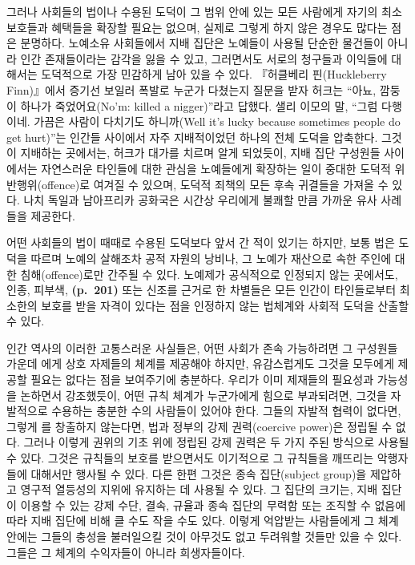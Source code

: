 그러나 사회들의 법이나 수용된 도덕이 그 범위 안에 있는 모든 사람에게
자기의 최소 보호들과 혜택들을 확장할 필요는 없으며, 실제로 그렇게 하지
않은 경우도 많다는 점은 분명하다. 노예소유 사회들에서 지배 집단은
노예들이 사용될 단순한 물건들이 아니라 인간 존재들이라는 감각을 잃을 수
있고, 그러면서도 서로의 청구들과 이익들에 대해서는 도덕적으로 가장
민감하게 남아 있을 수 있다. 『허클베리 핀(Huckleberry Finn)』에서 증기선
보일러 폭발로 누군가 다쳤는지 질문을 받자 허크는 “아뇨, 깜둥이 하나가
죽었어요(No'm: killed a nigger)”라고 답했다. 샐리 이모의 말, “그럼
다행이네. 가끔은 사람이 다치기도 하니까(Well it's lucky because
sometimes people do get hurt)”는 인간들 사이에서 자주 지배적이었던
하나의 전체 도덕을 압축한다. 그것이 지배하는 곳에서는, 허크가 대가를
치르며 알게 되었듯이, 지배 집단 구성원들 사이에서는 자연스러운 타인들에
대한 관심을 노예들에게 확장하는 일이 중대한 도덕적 위반행위(offence)로
여겨질 수 있으며, 도덕적 죄책의 모든 후속 귀결들을 가져올 수 있다. 나치
독일과 남아프리카 공화국은 시간상 우리에게 불쾌할 만큼 가까운 유사
사례들을 제공한다.

어떤 사회들의 법이 때때로 수용된 도덕보다 앞서 간 적이 있기는 하지만,
보통 법은 도덕을 따르며 노예의 살해조차 공적 자원의 낭비나, 그 노예가
재산으로 속한 주인에 대한 침해(offence)로만 간주될 수 있다. 노예제가
공식적으로 인정되지 않는 곳에서도, 인종, 피부색, \textbf{(p.~201)} 또는
신조를 근거로 한 차별들은 모든 인간이 타인들로부터 최소한의 보호를 받을
자격이 있다는 점을 인정하지 않는 법체계와 사회적 도덕을 산출할 수 있다.

인간 역사의 이러한 고통스러운 사실들은, 어떤 사회가 존속 가능하려면 그
구성원들 가운데 에게 상호 자제들의 체계를 제공해야 하지만,
유감스럽게도 그것을 모두에게 제공할 필요는 없다는 점을 보여주기에
충분하다. 우리가 이미 제재들의 필요성과 가능성을 논하면서 강조했듯이,
어떤 규칙 체계가 누군가에게 힘으로 부과되려면, 그것을 자발적으로
수용하는 충분한 수의 사람들이 있어야 한다. 그들의 자발적 협력이 없다면,
그렇게 를 창출하지 않는다면, 법과 정부의 강제
권력(coercive power)은 정립될 수 없다. 그러나 이렇게 권위의 기초 위에
정립된 강제 권력은 두 가지 주된 방식으로 사용될 수 있다. 그것은 규칙들의
보호를 받으면서도 이기적으로 그 규칙들을 깨뜨리는 악행자들에 대해서만
행사될 수 있다. 다른 한편 그것은 종속 집단(subject group)을 제압하고
영구적 열등성의 지위에 유지하는 데 사용될 수 있다. 그 집단의 크기는,
지배 집단이 이용할 수 있는 강제 수단, 결속, 규율과 종속 집단의 무력함
또는 조직할 수 없음에 따라 지배 집단에 비해 클 수도 작을 수도 있다.
이렇게 억압받는 사람들에게 그 체계 안에는 그들의 충성을 불러일으킬 것이
아무것도 없고 두려워할 것들만 있을 수 있다. 그들은 그 체계의 수익자들이
아니라 희생자들이다.

